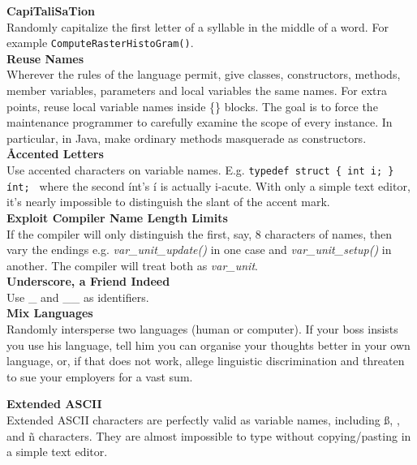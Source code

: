 \documentclass[11pt,twoside,a4paper]{article}
\begin{document}
\textbf{CapiTaliSaTion}~\\
Randomly capitalize the first letter of a syllable in the middle of a word. For example \texttt{ComputeRasterHistoGram()}.~\\ 

\textbf{Reuse Names}~\\
Wherever the rules of the language permit, give classes, constructors, methods, member variables, parameters and local variables the same names. For extra points, reuse local variable names inside \{\} blocks. The goal is to force the maintenance programmer to carefully examine the scope of every instance. In particular, in Java, make ordinary methods masquerade as constructors.~\\ 

\textbf{\AA ccented Letters}~\\
Use accented characters on variable names. E.g. \texttt{typedef struct \{ int i; \} {\'i}nt; } where the second {\'i}nt's {\'i} is actually i-acute. With only a simple text editor, it's nearly impossible to distinguish the slant of the accent mark.~\\ 

\textbf{Exploit Compiler Name Length Limits}~\\
If the compiler will only distinguish the first, say, 8 characters of names, then vary the endings e.g. \emph{var\_unit\_update()} in one case and \emph{var\_unit\_setup()} in another. The compiler will treat both as \emph{var\_unit}.~\\ 

\textbf{Underscore, a Friend Indeed}~\\
Use \_ and \_\_ as identifiers. ~\\

\textbf{Mix Languages}~\\
Randomly intersperse two languages (human or computer). If your boss insists you use his language, tell him you can organise your thoughts better in your own language, or, if that does not work, allege linguistic discrimination and threaten to sue your employers for a vast sum.~\\ 

\clearpage

\textbf{Extended ASCII}~\\
Extended ASCII characters are perfectly valid as variable names, including \ss , \DH , and {\~n} characters. They are almost impossible to type without copying/pasting in a simple text editor.~\\ 
\end{document}
